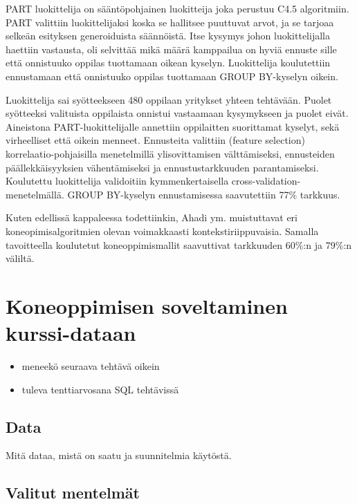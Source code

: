 \documentclass[finnish,twoside,openright]{HYgraduMLDS}
\begin{document}
PART luokittelija on sääntöpohjainen luokitteija joka perustuu C4.5 algoritmiin\cite{Ahadi:2016:SSM:2839509.2844640}. PART valittiin luokittelijaksi koska se hallitsee puuttuvat arvot, ja se tarjoaa selkeän esityksen generoiduista säännöistä. Itse kysymys johon luokittelijalla haettiin vastausta, oli selvittää mikä määrä kamppailua on hyviä ennuste sille että onnistuuko oppilas tuottamaan oikean kyselyn. Luokittelija koulutettiin ennustamaan että onnistuuko oppilas tuottamaan GROUP BY-kyselyn oikein.

Luokittelija sai syötteekseen 480 oppilaan yritykset yhteen tehtävään. Puolet syötteeksi valituista oppilaista onnistui vastaamaan kysymykseen ja puolet eivät. Aineistona PART-luokittelijalle annettiin oppilaitten suorittamat kyselyt, sekä virheelliset että oikein menneet. Ennusteita valittiin (feature selection) korrelaatio-pohjaisilla menetelmillä ylisovittamisen välttämiseksi, ennusteiden päällekkäisyyksien vähentämiseksi ja ennustustarkkuuden parantamiseksi. Koulutettu luokittelija validoitiin kymmenkertaisella cross-validation-menetelmällä. GROUP BY-kyselyn ennustamisessa saavutettiin 77\% tarkkuus.

Kuten edellissä kappaleessa todettiinkin, Ahadi ym. \cite{Ahadi:2016:SSM:2839509.2844640} muistuttavat eri koneopimisalgoritmien olevan voimakkaasti kontekstiriippuvaisia. Samalla tavoitteella koulutetut koneoppimismallit saavuttivat tarkkuuden 60\%:n ja 79\%:n väliltä.


\chapter{Koneoppimisen soveltaminen kurssi-dataan}

\begin{itemize}
    \item meneekö seuraava tehtävä oikein
    \item tuleva tenttiarvosana SQL tehtävissä
\end{itemize}

\section{Data}

Mitä dataa, mistä on saatu ja suunnitelmia käytöstä.


\section{Valitut mentelmät}
\end{document}
